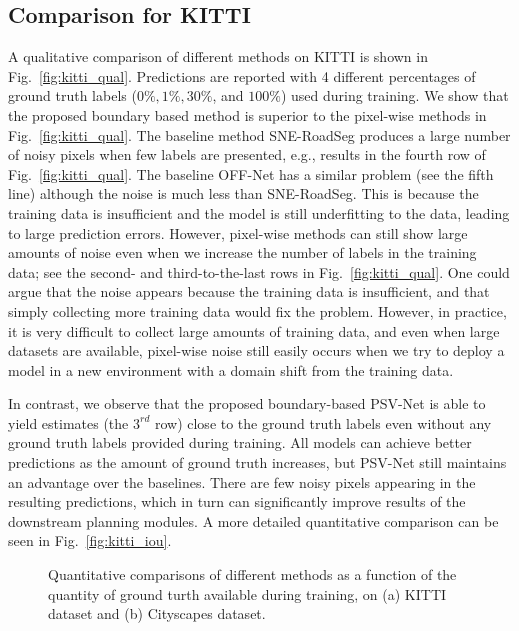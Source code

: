 \documentclass[letterpaper, 10 pt, journal, twoside]{ieeetran}
\begin{document}
\subsection{Comparison for KITTI} 
A qualitative comparison of different methods on KITTI  is shown in Fig.~\ref{fig:kitti_qual}. Predictions are reported with 4 different percentages of ground truth labels ($0\%, 1\%, 30\%$, and $100\%$) used during training. 
We show that the proposed boundary based method is superior to the pixel-wise methods in Fig.~\ref{fig:kitti_qual}. 
The baseline method SNE-RoadSeg produces a large number of noisy pixels when few labels are presented, e.g., results in the fourth row of Fig.~\ref{fig:kitti_qual}. The baseline OFF-Net has a similar problem (see the fifth line) although the noise is much less than  SNE-RoadSeg. 
This is because the training data is insufficient and the model is still underfitting to the data, leading to large prediction errors. However,  pixel-wise methods can still show large amounts of noise even when we increase the number of labels in the training data; see the second- and third-to-the-last rows in Fig.~\ref{fig:kitti_qual}. One could argue that the noise appears because the training data is insufficient, and that simply collecting more training data would fix the problem. However,
in practice, it is very difficult to collect
large amounts of training data, and even when
large datasets are available, pixel-wise noise
still easily occurs when we try to deploy a model
in a new environment with a domain shift
from the training data.

In contrast, we  observe that the proposed boundary-based PSV-Net is able to yield estimates (the $3^{rd}$ row) close to the ground truth labels even without any ground truth labels provided during training. All models can achieve better predictions as the amount of ground truth increases, but PSV-Net still maintains an advantage over the baselines. There are few noisy pixels appearing in the resulting predictions, which in turn can significantly improve results of the downstream planning modules. A more detailed quantitative comparison can be seen in Fig.~\ref{fig:kitti_iou}. 

\begin{figure} \vspace{7pt}
{
  \centering
  \caption{\small Quantitative comparisons of different methods as a function of the quantity of ground turth available during training, on (a) KITTI dataset and (b) Cityscapes dataset.
  }
\label{fig:iou_curves}  
}
\end{figure}
\end{document}
